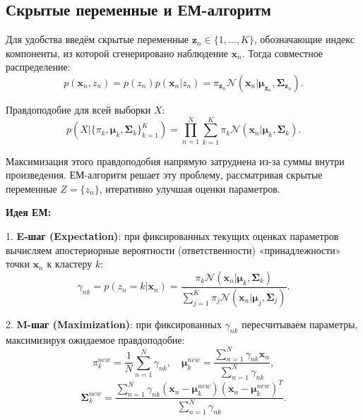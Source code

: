 \subsection{Скрытые переменные и ЕМ-алгоритм}

Для удобства введём скрытые переменные $\mathbf{z}_n \in \{1,\ldots,K\}$, обозначающие индекс компоненты, из которой сгенерировано наблюдение $\mathbf{x}_n$. Тогда совместное распределение:
\begin{equation*}
p(\mathbf{x}_n, z_n) = p(z_n) p(\mathbf{x}_n | z_n) = \pi_{\mathbf{z}_n} \mathcal{N}(\mathbf{x}_n|\boldsymbol{\mu}_{\mathbf{z}_n}, \boldsymbol{\Sigma}_{\mathbf{z}_n}).
\end{equation*}

Правдоподобие для всей выборки $X$:
\begin{equation*}
p(X|\{\pi_k,\boldsymbol{\mu}_k,\boldsymbol{\Sigma}_k\}_{k=1}^K) = \prod_{n=1}^N \sum_{k=1}^K \pi_k \mathcal{N}(\mathbf{x}_n|\boldsymbol{\mu}_k, \boldsymbol{\Sigma}_k).
\end{equation*}

Максимизация этого правдоподобия напрямую затруднена из-за суммы внутри произведения. ЕМ-алгоритм решает эту проблему, рассматривая скрытые переменные $Z=\{z_n\}$, итеративно улучшая оценки параметров.

\textbf{Идея ЕМ:} 

1. \textbf{E-шаг (Expectation)}: при фиксированных текущих оценках параметров вычисляем апостериорные вероятности (ответственности) «принадлежности» точки $\mathbf{x}_n$ к кластеру $k$:
\begin{equation*}
\gamma_{nk} = p(z_n = k|\mathbf{x}_n) = \frac{\pi_k \mathcal{N}(\mathbf{x}_n|\boldsymbol{\mu}_k,\boldsymbol{\Sigma}_k)}{\sum_{j=1}^K \pi_j \mathcal{N}(\mathbf{x}_n|\boldsymbol{\mu}_j,\boldsymbol{\Sigma}_j)}.
\end{equation*}

2. \textbf{M-шаг (Maximization)}: при фиксированных $\gamma_{nk}$ пересчитываем параметры, максимизируя ожидаемое правдоподобие:
\begin{equation*}
\pi_k^{new} = \frac{1}{N}\sum_{n=1}^N \gamma_{nk}, \quad \boldsymbol{\mu}_k^{new} = \frac{\sum_{n=1}^N \gamma_{nk}\mathbf{x}_n}{\sum_{n=1}^N \gamma_{nk}},
\end{equation*}
\begin{equation*}
\boldsymbol{\Sigma}_k^{new} = \frac{\sum_{n=1}^N \gamma_{nk}(\mathbf{x}_n - \boldsymbol{\mu}_k^{new})(\mathbf{x}_n - \boldsymbol{\mu}_k^{new})^T}{\sum_{n=1}^N \gamma_{nk}}.
\end{equation*}

